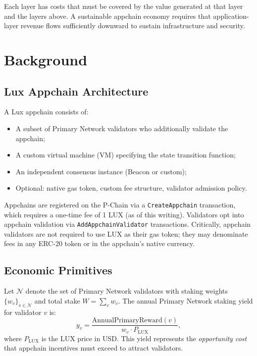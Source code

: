 \documentclass[11pt]{article}
\begin{document}
Each layer has costs that must be covered by the value generated at that layer and the
layers above. A sustainable appchain economy requires that application-layer revenue flows
sufficiently downward to sustain infrastructure and security.

\section{Background}
\label{sec:background}

\subsection{Lux Appchain Architecture}

A Lux appchain consists of:
\begin{itemize}[leftmargin=1.5em]
  \item A subset of Primary Network validators who additionally validate the appchain;
  \item A custom virtual machine (VM) specifying the state transition function;
  \item An independent consensus instance (Beacon or custom);
  \item Optional: native gas token, custom fee structure, validator admission policy.
\end{itemize}

Appchains are registered on the P-Chain via a \texttt{CreateAppchain} transaction, which
requires a one-time fee of 1 LUX (as of this writing). Validators opt into appchain
validation via \texttt{AddAppchainValidator} transactions. Critically, appchain validators
are not required to use LUX as their gas token; they may denominate fees in any ERC-20
token or in the appchain's native currency.

\subsection{Economic Primitives}

Let $\mathcal{N}$ denote the set of Primary Network validators with staking weights
$\{w_v\}_{v \in \mathcal{N}}$ and total stake $W = \sum_v w_v$. The annual Primary Network
staking yield for validator $v$ is:
\[
  y_v = \frac{\text{AnnualPrimaryReward}(v)}{w_v \cdot P_{\text{LUX}}},
\]
where $P_{\text{LUX}}$ is the LUX price in USD. This yield represents the \emph{opportunity
cost} that appchain incentives must exceed to attract validators.
\end{document}
